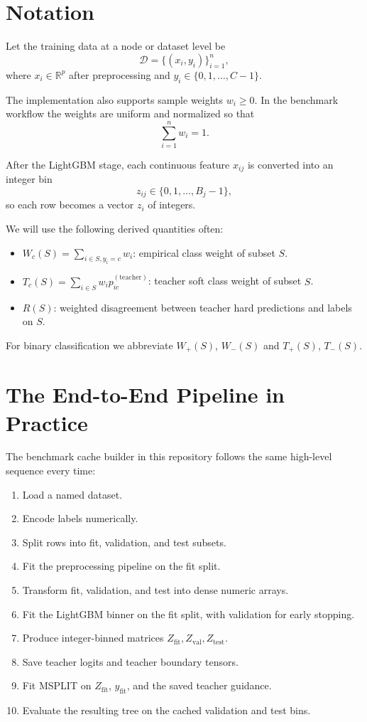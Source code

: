\documentclass[11pt]{article}
\begin{document}
\section{Notation}

Let the training data at a node or dataset level be
\[
\mathcal{D} = \{(x_i, y_i)\}_{i=1}^n,
\]
where \(x_i \in \mathbb{R}^p\) after preprocessing and \(y_i \in \{0,1,\dots,C-1\}\).

The implementation also supports sample weights \(w_i \ge 0\). In the benchmark workflow the weights are uniform and normalized so that
\[
\sum_{i=1}^n w_i = 1.
\]

After the LightGBM stage, each continuous feature \(x_{ij}\) is converted into an integer bin
\[
z_{ij} \in \{0,1,\dots,B_j-1\},
\]
so each row becomes a vector \(z_i\) of integers.

We will use the following derived quantities often:

\begin{itemize}
\item \(W_c(S) = \sum_{i \in S, y_i = c} w_i\): empirical class weight of subset \(S\).
\item \(T_c(S) = \sum_{i \in S} w_i p_{ic}^{(\mathrm{teacher})}\): teacher soft class weight of subset \(S\).
\item \(R(S)\): weighted disagreement between teacher hard predictions and labels on \(S\).
\end{itemize}

For binary classification we abbreviate \(W_+(S)\), \(W_-(S)\) and \(T_+(S)\), \(T_-(S)\).

\section{The End-to-End Pipeline in Practice}

The benchmark cache builder in this repository follows the same high-level sequence every time:

\begin{enumerate}
\item Load a named dataset.
\item Encode labels numerically.
\item Split rows into fit, validation, and test subsets.
\item Fit the preprocessing pipeline on the fit split.
\item Transform fit, validation, and test into dense numeric arrays.
\item Fit the LightGBM binner on the fit split, with validation for early stopping.
\item Produce integer-binned matrices \(Z_{\mathrm{fit}}, Z_{\mathrm{val}}, Z_{\mathrm{test}}\).
\item Save teacher logits and teacher boundary tensors.
\item Fit MSPLIT on \(Z_{\mathrm{fit}}\), \(y_{\mathrm{fit}}\), and the saved teacher guidance.
\item Evaluate the resulting tree on the cached validation and test bins.
\end{enumerate}
\end{document}
